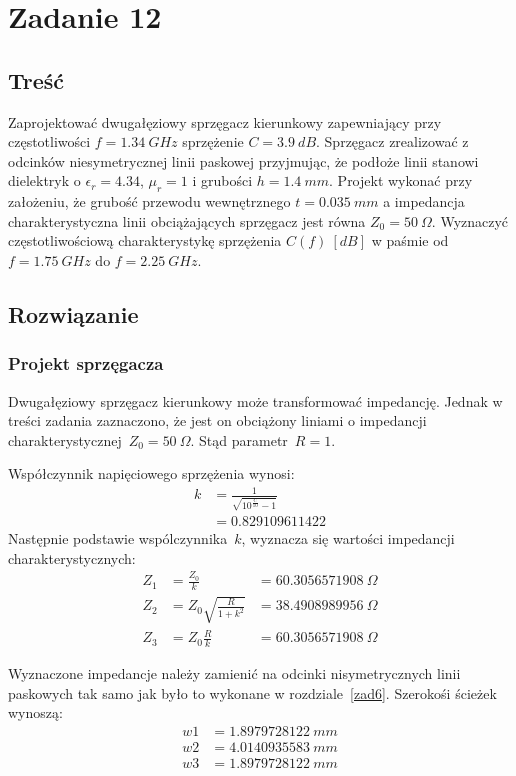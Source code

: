\documentclass[rep.tex]{subfiles}
\begin{document}
\chapter{Zadanie 12}
\label{zad12}
\section{Treść}
Zaprojektować dwugałęziowy sprzęgacz kierunkowy zapewniający przy częstotliwości $f = 1.34~GHz$ sprzężenie $C = 3.9~dB$.
Sprzęgacz zrealizować z odcinków niesymetrycznej linii paskowej przyjmując, że podłoże linii stanowi dielektryk o $\epsilon_r = 4.34$, $\mu_r = 1$ i grubości $h = 1.4~mm$.
Projekt wykonać przy założeniu, że grubość przewodu wewnętrznego $t = 0.035~mm$ a impedancja charakterystyczna linii obciążających sprzęgacz jest równa $Z_0 = 50~\Omega$.
Wyznaczyć częstotliwościową charakterystykę sprzężenia $C(f)~[dB]$ w paśmie od $f = 1.75~GHz$ do $f = 2.25~GHz$.

\section{Rozwiązanie}
\subsection{Projekt sprzęgacza}
Dwugałęziowy sprzęgacz kierunkowy może transformować impedancję.
Jednak w treści zadania zaznaczono, że jest on obciążony liniami o impedancji charakterystycznej~$Z_0 = 50~\Omega$.
Stąd parametr~$R = 1$.

Współczynnik napięciowego sprzężenia wynosi:
\begin{align}
  k &= \frac{1}{\sqrt{10^{\frac{C}{10}} - 1}} \\
  &= 0.829109611422 \nonumber
\end{align}
Następnie podstawie wspólczynnika~$k$, wyznacza się wartości impedancji charakterystycznych:
\begin{align}
  Z_1 &= \frac{Z_0}{k} &= 60.3056571908~\Omega \\
  Z_2 &= Z_0\sqrt{\frac{R}{1 + k^2}} &= 38.4908989956~\Omega \\
  Z_3 &= Z_0\frac{R}{k} &= 60.3056571908~\Omega
\end{align}

Wyznaczone impedancje należy zamienić na odcinki nisymetrycznych linii paskowych tak samo jak było to wykonane w rozdziale~\ref{zad6}.
Szerokośi ścieżek wynoszą:
\begin{align}
  w1 &= 1.8979728122~mm \nonumber \\
  w2 &= 4.0140935583~mm \nonumber \\
  w3 &= 1.8979728122~mm \nonumber
\end{align}
\end{document}
